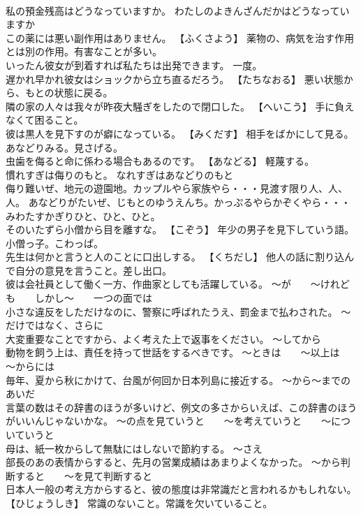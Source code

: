 \documentclass[8pt]{extreport}
\begin{document}
\begin{CJK}{UTF8}{min}
\\	私の預金残高はどうなっていますか。	わたしのよきんざんだかはどうなっていますか 
\\	この薬には悪い副作用はありません。	【ふくさよう】 薬物の、病気を治す作用とは別の作用。有害なことが多い。
\\	いったん彼女が到着すれば私たちは出発できます。	一度。
\\	遅かれ早かれ彼女はショックから立ち直るだろう。	【たちなおる】 悪い状態から、もとの状態に戻る。
\\	隣の家の人々は我々が昨夜大騒ぎをしたので閉口した。	【へいこう】 手に負えなくて困ること。
\\	彼は黒人を見下すのが癖になっている。	【みくだす】 相手をばかにして見る。あなどりみる。見さげる。
\\	虫歯を侮ると命に係わる場合もあるのです。	【あなどる】 軽蔑する。
\\	慣れすぎは侮りのもと。	なれすぎはあなどりのもと 
\\	侮り難いぜ、地元の遊園地。カップルやら家族やら・・・見渡す限り人、人、人。	あなどりがたいぜ、じもとのゆうえんち。かっぷるやらかぞくやら・・・みわたすかぎりひと、ひと、ひと。 
\\	そのいたずら小僧から目を離すな。	【こぞう】 年少の男子を見下していう語。小僧っ子。こわっぱ。
\\	先生は何かと言うと人のことに口出しする。	【くちだし】 他人の話に割り込んで自分の意見を言うこと。差し出口。
\\	彼は会社員として働く一方、作曲家としても活躍している。	～が　　～けれども　　しかし～　　一つの面では
\\	小さな違反をしただけなのに、警察に呼ばれたうえ、罰金まで払わされた。	～だけではなく、さらに
\\	大変重要なことですから、よく考えた上で返事をください。	～してから
\\	動物を飼う上は、責任を持って世話をするべきです。	～ときは　　～以上は　　～からには
\\	毎年、夏から秋にかけて、台風が何回か日本列島に接近する。	～から～までのあいだ
\\	言葉の数はその辞書のほうが多いけど、例文の多さからいえば、この辞書のほうがいいんじゃないかな。	～の点を見ていうと　　～を考えていうと　　～についていうと
\\	母は、紙一枚からして無駄にはしないで節約する。	～さえ
\\	部長のあの表情からすると、先月の営業成績はあまりよくなかった。	～から判断すると　　～を見て判断すると
\\	日本人一般の考え方からすると、彼の態度は非常識だと言われるかもしれない。	【ひじょうしき】 常識のないこと。常識を欠いていること。

\end{CJK}
\end{document}
